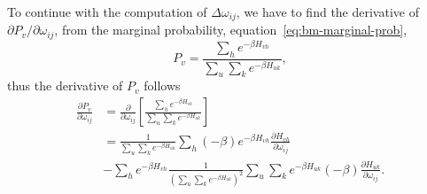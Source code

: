To continue with the computation of $\Delta \omega_{ij}$, we have to find the derivative of $\partial P_{v}/\partial \omega_{ij}$, from the marginal probability, equation~\ref{eq:bm-marginal-prob},
\begin{equation}
  \label{eq:bm-marginal-prob-expansion}
  P_{v} = \frac{\sum_{h} e^{-\beta H_{vh}}}{\sum_{u} \sum_{k} e^{-\beta H_{u k}}},
\end{equation}
thus the derivative of $P_{v}$ follows
\begin{equation}
  \label{eq:bm-marginal-prob-grad}
  \begin{split}
    \frac{\partial P_{v}}{\partial \omega_{ij}} & = \frac{\partial}{\partial \omega_{ij}} \left[ \frac{\sum_{h} e^{-\beta H_{vh}}}{\sum_{u} \sum_{k} e^{-\beta H_{u k}}} \right] \\
    & = \frac{1}{\sum_{u} \sum_{k} e^{-\beta H_{u k}}} \sum_{h} (-\beta) e^{-\beta H_{vh}} \frac{\partial H_{vh}}{\partial \omega_{ij}} \\
    & - \sum_{h} e^{-\beta H_{vh}} \frac{1}{{\left( \sum_{u} \sum_{k} e^{-\beta H_{u k}} \right)}^{2}} \sum_{u} \sum_{k} e^{-\beta H_{u k}} (-\beta) \frac{\partial H_{u k}}{\partial \omega_{ij}}.
  \end{split}
\end{equation}

